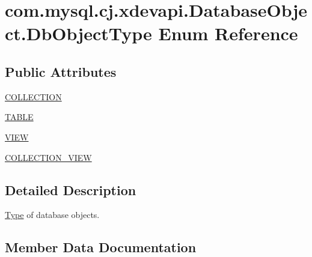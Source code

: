 \hypertarget{enumcom_1_1mysql_1_1cj_1_1xdevapi_1_1_database_object_1_1_db_object_type}{}\section{com.\+mysql.\+cj.\+xdevapi.\+Database\+Object.\+Db\+Object\+Type Enum Reference}
\label{enumcom_1_1mysql_1_1cj_1_1xdevapi_1_1_database_object_1_1_db_object_type}
\subsection*{Public Attributes}
\begin{DoxyCompactItemize}
\item 
\mbox{\hyperlink{enumcom_1_1mysql_1_1cj_1_1xdevapi_1_1_database_object_1_1_db_object_type_a907d4fe5b0571a5aaa83cb6bbb6346bf}{C\+O\+L\+L\+E\+C\+T\+I\+ON}}
\item 
\mbox{\hyperlink{enumcom_1_1mysql_1_1cj_1_1xdevapi_1_1_database_object_1_1_db_object_type_a760962143f881538e3c2b2a68cf34ab3}{T\+A\+B\+LE}}
\item 
\mbox{\hyperlink{enumcom_1_1mysql_1_1cj_1_1xdevapi_1_1_database_object_1_1_db_object_type_a55a77a337fcc055c485de95e66a8f8fb}{V\+I\+EW}}
\item 
\mbox{\hyperlink{enumcom_1_1mysql_1_1cj_1_1xdevapi_1_1_database_object_1_1_db_object_type_a2af5a6327c79769362750bd3827ac6ae}{C\+O\+L\+L\+E\+C\+T\+I\+O\+N\+\_\+\+V\+I\+EW}}
\end{DoxyCompactItemize}


\subsection{Detailed Description}
\mbox{\hyperlink{enumcom_1_1mysql_1_1cj_1_1xdevapi_1_1_type}{Type}} of database objects. 

\subsection{Member Data Documentation}
\mbox{\label{enumcom_1_1mysql_1_1cj_1_1xdevapi_1_1_database_object_1_1_db_object_type_a907d4fe5b0571a5aaa83cb6bbb6346bf}} 
